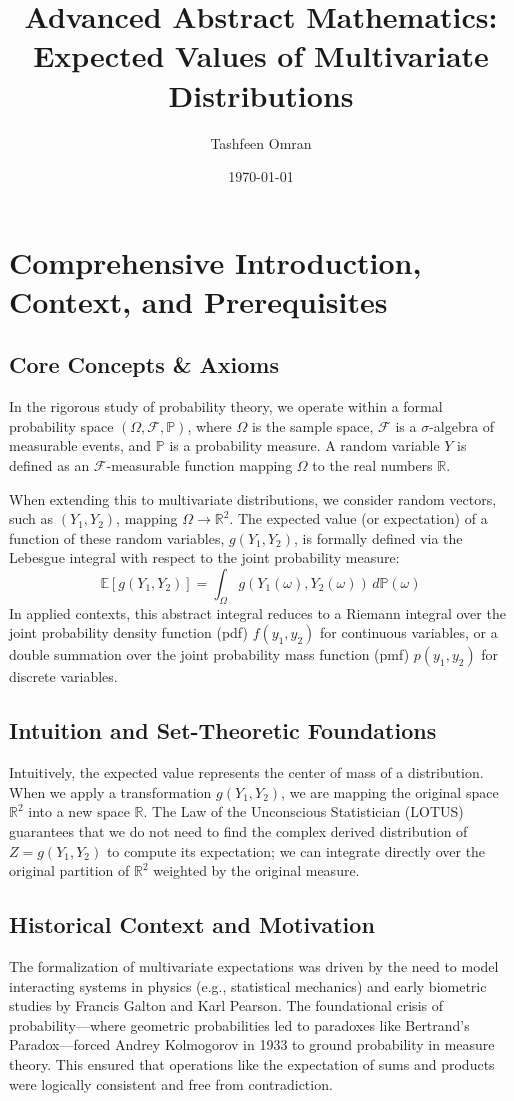 \documentclass[11pt, a4paper]{article}
\title{\textbf{Advanced Abstract Mathematics: \\ Expected Values of Multivariate Distributions}}
\author{Tashfeen Omran}
\date{\today}
\theoremstyle{definition}
\theoremstyle{remark}
\newcommand{\R}{\mathbb{R}}
\newcommand{\E}{\mathbb{E}}
\newcommand{\Prob}{\mathbb{P}}
\newcommand{\F}{\mathcal{F}}
\begin{document}
\maketitle
\tableofcontents
\newpage

\section{Comprehensive Introduction, Context, and Prerequisites}

\subsection{Core Concepts \& Axioms}
In the rigorous study of probability theory, we operate within a formal probability space $(\Omega, \F, \Prob)$, where $\Omega$ is the sample space, $\F$ is a $\sigma$-algebra of measurable events, and $\Prob$ is a probability measure. A random variable $Y$ is defined as an $\F$-measurable function mapping $\Omega$ to the real numbers $\R$. 

When extending this to multivariate distributions, we consider random vectors, such as $(Y_1, Y_2)$, mapping $\Omega \to \R^2$. The expected value (or expectation) of a function of these random variables, $g(Y_1, Y_2)$, is formally defined via the Lebesgue integral with respect to the joint probability measure:
\[
\E[g(Y_1, Y_2)] = \int_{\Omega} g(Y_1(\omega), Y_2(\omega)) \, d\Prob(\omega)
\]
In applied contexts, this abstract integral reduces to a Riemann integral over the joint probability density function (pdf) $f(y_1, y_2)$ for continuous variables, or a double summation over the joint probability mass function (pmf) $p(y_1, y_2)$ for discrete variables.

\subsection{Intuition and Set-Theoretic Foundations}
Intuitively, the expected value represents the center of mass of a distribution. When we apply a transformation $g(Y_1, Y_2)$, we are mapping the original space $\R^2$ into a new space $\R$. The Law of the Unconscious Statistician (LOTUS) guarantees that we do not need to find the complex derived distribution of $Z = g(Y_1, Y_2)$ to compute its expectation; we can integrate directly over the original partition of $\R^2$ weighted by the original measure.

\subsection{Historical Context and Motivation}
The formalization of multivariate expectations was driven by the need to model interacting systems in physics (e.g., statistical mechanics) and early biometric studies by Francis Galton and Karl Pearson. The foundational crisis of probability—where geometric probabilities led to paradoxes like Bertrand's Paradox—forced Andrey Kolmogorov in 1933 to ground probability in measure theory. This ensured that operations like the expectation of sums and products were logically consistent and free from contradiction.
\end{document}
